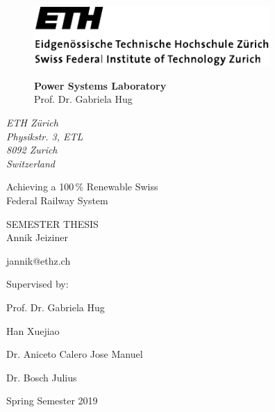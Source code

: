 


\pagestyle{empty}

\begin{figure}
    \begin{minipage}[b]{0.5\linewidth}
        \includegraphics[width=0.8\textwidth]{figures/ethlogo}
    \end{minipage}
    \hfill
    \begin{minipage}[b]{0.45\linewidth}
        \flushright
        \textbf{Power Systems Laboratory}\\
        \vspace{3mm}
        Prof. Dr. Gabriela Hug
    \end{minipage}
\end{figure}


\begin{flushright}
    \textit{ETH Zürich\\
    Physikstr. 3, ETL\\
    8092 Zurich\\
    Switzerland}
\end{flushright}

\phantom{u}
\vspace{1.5cm}
\noindent\Huge{Achieving a 100\,\% Renewable Swiss \\ Federal
Railway System}
\vspace{1.5cm}

\Large
SEMESTER THESIS\\

\vspace*{5cm} \large
Annik Jeiziner

jannik@ethz.ch

\normalsize

\vspace{1.5cm}

Supervised by:

Prof. Dr. Gabriela Hug

Han Xuejiao

Dr. Aniceto Calero Jose Manuel

Dr. Bosch Julius

\vspace{0.5cm}
Spring Semester 2019